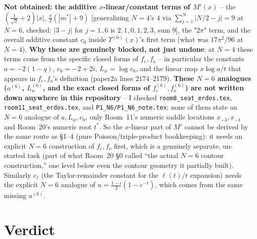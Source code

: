 \documentclass[11pt]{article}
\begin{document}
\textbf{Not obtained: the additive $x$-linear/constant terms of $M'(x)$} -- the
$(\frac1{\sqrt2}+2)|x|$, $\frac\pi2(|m^*|+9)$ [generalizing $N=4$'s $4$ via $\sum_{j=1}^N|N/2-j|=9$
at $N=6$, checked: $|3-j|$ for $j=1..6$ is $2,1,0,1,2,3$, sum $9$], the "$2\pi$" term, and the
overall additive constant $c_0$ inside $\Upsilon^{(6)}(x)$'s first term (what was $17\pi^2/96$ at
$N=4$). \textbf{Why these are genuinely blocked, not just undone}: at $N=4$ these terms come from
the specific closed forms of $f_e,f_o$ -- in particular the constants $a=-2(1-q)$, $c_0=-2+2i$,
$L_w=\log c_0$, and the linear map $x\log a/t$ that appears in $f_e,f_o$'s definition (paper2a
lines 2174--2179). \textbf{These $N=6$ analogues ($a^{(6)}$, $L_w^{(6)}$, and the exact closed
forms of $f_e^{(6)},f_o^{(6)}$) are not written down anywhere in this repository} -- I checked
\texttt{room8\_seat\_erdos.tex}, \texttt{room11\_seat\_erdos.tex}, and
\texttt{P1\_N6/P1\_N6\_note.tex}; none of them state an $N=6$ analogue of $a,L_w,c_0$, only
Room~11's numeric saddle locations $x_{-3},x_{-1}$ and Room~20's numeric root $t^*$. So the
$x$-linear part of $M'$ cannot be derived by the same route as \S1--4 (pure Poisson/triple-product
bookkeeping): it needs an explicit $N=6$ construction of $f_e,f_o$ first, which is a genuinely
separate, un-started task (part of what Room~20 \S0 called ``the actual $N=6$ contour
construction,'' one level below even the contour geometry it partially built). Similarly $c_\ell$
(the Taylor-remainder constant for the $\ell(t)/t$ expansion) needs the explicit $N=6$ analogue of
$u=\frac{1-i}2(1-e^{-t})$, which comes from the same missing $a^{(6)}$.

\section*{Verdict}
\end{document}
